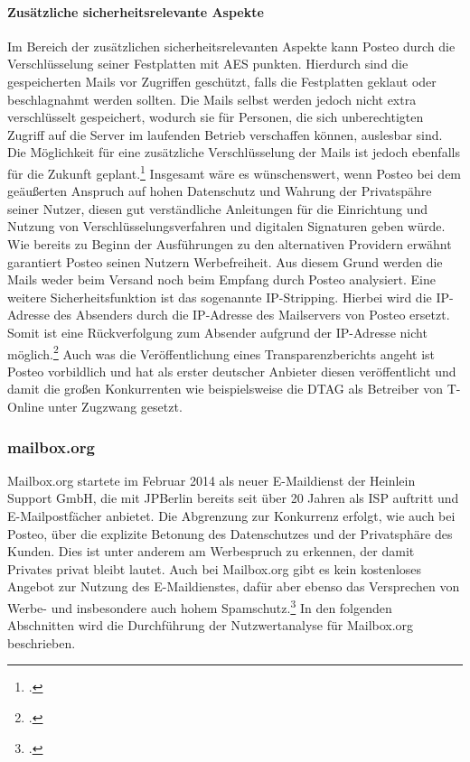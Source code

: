 \documentclass  [paper=a4,
				fontsize=12pt,
				listof=totoc,
				bibliography=totoc
				]{scrreprt}
\begin{document}
					\paragraph{Zusätzliche sicherheitsrelevante Aspekte}
						Im Bereich der zusätzlichen sicherheitsrelevanten Aspekte kann Posteo durch die Verschlüsselung seiner Festplatten mit \ac{AES} punkten.
						Hierdurch sind die gespeicherten Mails vor Zugriffen geschützt, falls die Festplatten geklaut oder beschlagnahmt werden sollten.
						Die Mails selbst werden jedoch nicht extra verschlüsselt gespeichert, wodurch sie für Personen, die sich unberechtigten Zugriff auf die Server im laufenden Betrieb verschaffen können, auslesbar sind.
						Die Möglichkeit für eine zusätzliche Verschlüsselung der Mails ist jedoch ebenfalls für die Zukunft geplant.\footcite[Vgl.][]{Posteo2013c}
						Insgesamt wäre es wünschenswert, wenn Posteo bei dem geäußerten Anspruch auf hohen Datenschutz und Wahrung der Privatspähre seiner Nutzer, diesen gut verständliche Anleitungen für die Einrichtung und Nutzung von Verschlüsselungsverfahren und digitalen Signaturen geben würde.
						Wie bereits zu Beginn der Ausführungen zu den alternativen Providern erwähnt garantiert Posteo seinen Nutzern Werbefreiheit.
						Aus diesem Grund werden die Mails weder beim Versand noch beim Empfang durch Posteo analysiert.
						Eine weitere Sicherheitsfunktion ist das sogenannte \ac{IP}-Stripping.
						Hierbei wird die \ac{IP}-Adresse des Absenders durch die \ac{IP}-Adresse des Mailservers von Posteo ersetzt.
						Somit ist eine Rückverfolgung zum Absender aufgrund der \ac{IP}-Adresse nicht möglich.\footcite[Vgl.][]{Posteo2013a}
						Auch was die Veröffentlichung eines Transparenzberichts angeht ist Posteo vorbildlich und hat als erster deutscher Anbieter diesen veröffentlicht und damit die großen Konkurrenten wie beispielsweise die \ac{DTAG} als Betreiber von T-Online unter Zugzwang gesetzt.
				\newpage
				\subsubsection{mailbox.org}
				\label{subsubsec:mailbox}
					Mailbox.org startete im Februar 2014 als neuer E-Maildienst der Heinlein Support GmbH, die mit JPBerlin bereits seit über 20 Jahren als \ac{ISP} auftritt und E-Mailpostfächer anbietet.
					Die Abgrenzung zur Konkurrenz erfolgt, wie auch bei Posteo, über die explizite Betonung des Datenschutzes und der Privatsphäre des Kunden.
					Dies ist unter anderem am Werbespruch zu erkennen, der \glqq damit Privates privat bleibt\grqq{} lautet.
					Auch bei Mailbox.org gibt es kein kostenloses Angebot zur Nutzung des E-Maildienstes, dafür aber ebenso das Versprechen von Werbe- und insbesondere auch hohem Spamschutz.\footcite[Vgl.][]{Mailbox2014}
					In den folgenden Abschnitten wird die Durchführung der Nutzwertanalyse für Mailbox.org beschrieben.
					
\end{document}
